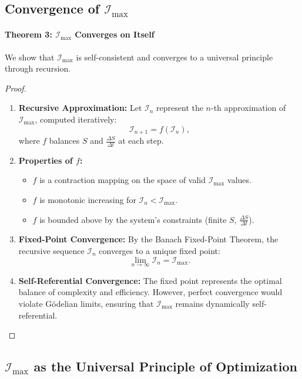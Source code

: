 \documentclass[12pt]{article}
\begin{document}
\subsection{Convergence of \(\mathcal{I}_{\text{max}}\)}

\paragraph{Theorem 3: \(\mathcal{I}_{\text{max}}\) Converges on Itself}
We show that \(\mathcal{I}_{\text{max}}\) is self-consistent and converges to a universal principle through recursion.

\begin{proof}
\begin{enumerate}
    \item \textbf{Recursive Approximation:}
    Let \(\mathcal{I}_n\) represent the \(n\)-th approximation of \(\mathcal{I}_{\text{max}}\), computed iteratively:
    \[
    \mathcal{I}_{n+1} = f(\mathcal{I}_n),
    \]
    where \(f\) balances \(S\) and \(\frac{\Delta S}{\Delta t}\) at each step.

    \item \textbf{Properties of \(f\):}
    \begin{itemize}
        \item \(f\) is a contraction mapping on the space of valid \(\mathcal{I}_{\text{max}}\) values.
        \item \(f\) is monotonic increasing for \(\mathcal{I}_n < \mathcal{I}_{\text{max}}\).
        \item \(f\) is bounded above by the system's constraints (finite \(S\), \(\frac{\Delta S}{\Delta t}\)).
    \end{itemize}

    \item \textbf{Fixed-Point Convergence:}
    By the Banach Fixed-Point Theorem, the recursive sequence \(\mathcal{I}_n\) converges to a unique fixed point:
    \[
    \lim_{n \to \infty} \mathcal{I}_n = \mathcal{I}_{\text{max}}.
    \]

    \item \textbf{Self-Referential Convergence:}
    The fixed point represents the optimal balance of complexity and efficiency. However, perfect convergence would violate Gödelian limits, ensuring that \(\mathcal{I}_{\text{max}}\) remains dynamically self-referential.
\end{enumerate}
\end{proof}


\subsection{\(\mathcal{I}_{\text{max}}\) as the Universal Principle of Optimization}
\end{document}
